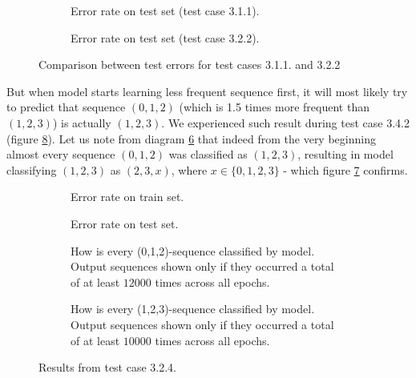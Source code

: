 \documentclass[shortabstract,lic,english]{iithesis}
\begin{document}
\begin{figure}[h]
\begin{subfigure}[b]{.49\textwidth}
    \def\svgwidth{\textwidth}
    
    \caption{Error rate on test set (test case 3.1.1).}
    \label{fig:t311_test_error_comp}
\end{subfigure}
\begin{subfigure}[b]{.49\textwidth}
    \def\svgwidth{\textwidth}
    
    \caption{Error rate on test set (test case 3.2.2).}
    \label{fig:t322_test_error_comp}
\end{subfigure}
\caption{Comparison between test errors for test cases 3.1.1. and 3.2.2}
\label{fig:t311_t322_test_error_comp}
\end{figure}

But when model starts learning less frequent sequence first, it will most likely try to predict that sequence $(0, 1, 2)$ (which is 1.5 times more frequent than $(1, 2, 3)$) is actually $(1, 2, 3)$. We experienced such result during test case 3.4.2 (figure \ref{fig:t342_results}). Let us note from diagram \ref{fig:t342_predictions_012} that indeed from the very beginning almost every sequence $(0,1,2)$ was classified as $(1, 2, 3)$, resulting in model classifying $(1, 2, 3)$ as $(2, 3, x)$, where $x \in \lbrace0, 1, 2, 3\rbrace$ - which figure \ref{fig:t342_predictions_123} confirms. 

\begin{figure}[ht]
\begin{subfigure}[b]{.49\textwidth}
    \def\svgwidth{\textwidth}
    
    \caption{Error rate on train set.}
    \label{fig:t342_data_error}
\end{subfigure}
\begin{subfigure}[b]{.49\textwidth}
    \def\svgwidth{\textwidth}
    
    \caption{Error rate on test set.}
    \label{fig:t342_test_error}
\end{subfigure}
\begin{subfigure}[b]{.49\textwidth}
    \def\svgwidth{\textwidth}
    
    \caption{How is every (0,1,2)-sequence classified by model. Output sequences shown only if they occurred a total
    of at least $12000$ times across all epochs.}
    \label{fig:t342_predictions_012}
\end{subfigure}
\begin{subfigure}[b]{.49\textwidth}
    \def\svgwidth{\textwidth}
    
    \caption{How is every (1,2,3)-sequence classified by model. Output sequences shown only if they occurred a total
    of at least $10000$ times across all epochs.}
    \label{fig:t342_predictions_123}
\end{subfigure}
\caption{Results from test case 3.2.4.}
\label{fig:t342_results}
\end{figure}
\end{document}

